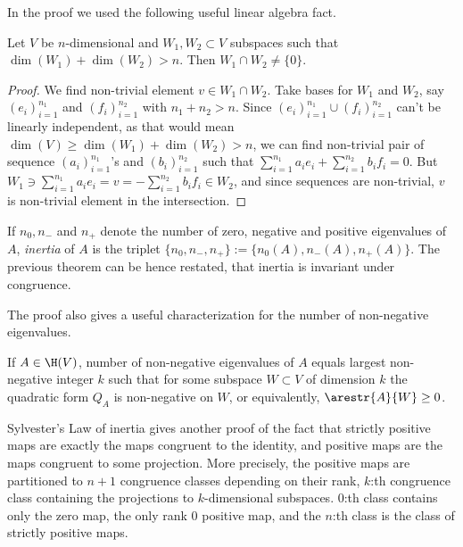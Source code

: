 In the proof we used the following useful linear algebra fact.

\begin{lem}
	Let $V$ be $n$-dimensional and $W_{1}, W_{2} \subset V$ subspaces such that $\dim(W_{1}) + \dim(W_{2}) > n$. Then $W_{1} \cap W_{2} \neq \{0\}$.
\end{lem}
\begin{proof}
	We find non-trivial element $v \in W_{1} \cap W_{2}$. Take bases for $W_{1}$ and $W_{2}$, say $(e_{i})_{i = 1}^{n_{1}}$ and $(f_{i})_{i = 1}^{n_{2}}$ with $n_{1} + n_{2} > n$. Since $(e_{i})_{i = 1}^{n_{1}} \cup (f_{i})_{i = 1}^{n_{2}}$ can't be linearly independent, as that would mean $\dim(V) \geq \dim(W_{1}) + \dim(W_{2}) > n$, we can find non-trivial pair of sequence $(a_{i})_{i = 1}^{n_{1}}$'s and $(b_{i})_{i = 1}^{n_{2}}$ such that $\sum_{i = 1}^{n_{1}} a_{i} e_{i} + \sum_{i = 1}^{n_{2}} b_{i} f_{i} = 0$. But $W_{1} \ni \sum_{i = 1}^{n_{1}} a_{i} e_{i} = v = -\sum_{i = 1}^{n_{2}} b_{i} f_{i} \in W_{2}$, and since sequences are non-trivial, $v$ is non-trivial element in the intersection.
\end{proof}

If $n_{0}, n_{-}$ and $n_{+}$ denote the number of zero, negative and positive eigenvalues of $A$, \textit{inertia} of $A$ is the triplet $\{n_{0}, n_{-}, n_{+} \} := \{n_{0}(A), n_{-}(A), n_{+}(A) \}$. The previous theorem can be hence restated, that inertia is invariant under congruence.

The proof also gives a useful characterization for the number of non-negative eigenvalues.

\begin{kor}\label{subspace_lemma}
	If $A \in \H(V)$, number of non-negative eigenvalues of $A$ equals largest non-negative integer $k$ such that for some subspace $W \subset V$ of dimension $k$ the quadratic form $Q_{A}$ is non-negative on $W$, or equivalently, $\arestr{A}{W} \geq 0$.
\end{kor}

Sylvester's Law of inertia gives another proof of the fact that strictly positive maps are exactly the maps congruent to the identity, and positive maps are the maps congruent to some projection. More precisely, the positive maps are partitioned to $n + 1$ congruence classes depending on their rank, $k$:th congruence class containing the projections to $k$-dimensional subspaces. $0$:th class contains only the zero map, the only rank $0$ positive map, and the $n$:th class is the class of strictly positive maps.

